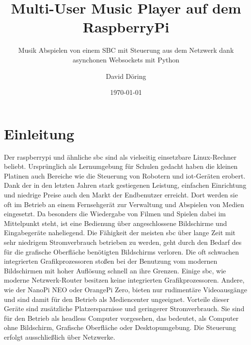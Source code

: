 \documentclass[12pt,a4paper,hidelinks]{scrreprt}
\title{Multi-User Music Player auf dem RaspberryPi}
\subtitle{Musik Abspielen von einem SBC mit Steuerung aus dem Netzwerk dank asynchonen Websockets mit Python}
\author{David Döring}
\affil{$\blacktriangle$ Hochschule Harz}
\date{\today}
\begin{document}
\sloppy

\maketitle
{}\font=3.45pt	%
\font=1.6pt	%

%
%
\newpage
\tableofcontents
\newpage
\chapter{Einleitung}\label{ch:Einleitung}
    Der \gls{raspberrypi} und ähnliche \gls{sbc} sind als vielseitig einsetzbare Linux-Rechner beliebt. Ursprünglich als Lernumgebung für Schulen gedacht haben die kleinen Platinen auch Bereiche wie die Steuerung von Robotern und \gls{iot}-Geräten erobert. Dank der in den letzten Jahren stark gestiegenen Leistung, einfachen Einrichtung und niedrige Preise auch den Markt der Endbenutzer erreicht. Dort werden sie oft im Betrieb an einem Fernsehgerät zur Verwaltung und Abspielen von Medien eingesetzt.
    Da besonders die Wiedergabe von Filmen und Spielen dabei im Mittelpunkt steht, ist eine Bedienung über angeschlossene Bildschirme und Eingabegeräte naheliegend. 
    Die Fähigkeit der meisten \gls{sbc} über lange Zeit mit sehr niedrigem Stromverbrauch betrieben zu werden, geht durch den Bedarf des für die grafische Oberfläche benötigten Bildschirms verloren. Die oft schwachen integrierten Grafikprozessoren stoßen bei der Benutzung vom modernen Bildschirmen mit hoher Auflösung schnell an ihre Grenzen. 
    Einige \gls{sbc}, wie moderne Netzwerk-Router besitzen keine integrierten Grafikprozessoren. Andere, wie der NanoPi NEO oder OrangePi Zero, bieten nur rudimentäre Videoausgänge und sind damit für den Betrieb als Mediencenter ungeeignet. Vorteile dieser Geräte sind zusätzliche Platzersparnisse und geringerer Stromverbrauch. Sie sind für den Betrieb als \gls{headless} Computer vorgesehen, das bedeutet, als Computer ohne Bildschirm, Grafische Oberfläche oder Desktopumgebung. Die Steuerung erfolgt ausschließlich über Netzwerke.
     
\end{document}
